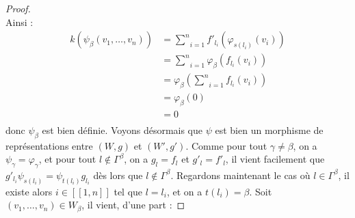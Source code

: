 \documentclass[a4paper,11pt]{article}
\begin{document}
\begin{proof}
\[	\]
Ainsi :
\[
\begin{array}{rl}
	k(\psi_{\beta}(v_{1},\dots,v_{n})) & = \underset{i=1}{\overset{n}{\sum}}f'_{l_{i}}(\varphi_{s(l_{i})}(v_{i})) \\ 
	& = \underset{i=1}{\overset{n}{\sum}} \varphi_{\beta}(f_{l_{i}}(v_{i}))\\
	& = \varphi_{\beta}(\underset{i=1}{\overset{n}{\sum}}f_{l_{i}}(v_{i}))\\
	& = \varphi_{\beta}(0) \\
	& = 0 \\
\end{array}
\]
donc $\psi_{\beta}$ est bien définie. Voyons désormais que $\psi$ est bien un morphisme de représentations entre $(W,g)$ et $(W',g')$. Comme pour tout $\gamma\neq\beta$, on a $\psi_{\gamma}=\varphi_{\gamma}$, et pour tout $l\notin\Gamma^{\beta}$, on a $g_{l}=f_{l}$ et $g'_{l}=f'_{l}$, il vient facilement que $g'_{l_{i}}\psi_{s(l_{i})}=\psi_{t(l_{i})}g_{l_{i}}$ dès lors que $l\notin\Gamma^{\beta}$. Regardons maintenant le cas où $l\in\Gamma^{\beta}$, il existe alors $i\in[\![1,n]\!]$ tel que $l=l_{i}$, et on a $t(l_{i})=\beta$. Soit $(v_{1},\dots,v_{n})\in W_{\beta}$, il vient, d'une part :


\end{proof}
\end{document}
